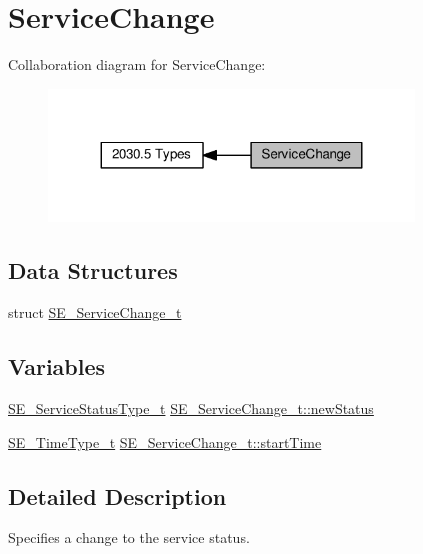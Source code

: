 \hypertarget{group__ServiceChange}{}\section{Service\+Change}
\label{group__ServiceChange}
Collaboration diagram for Service\+Change\+:\nopagebreak
\begin{figure}[H]
\begin{center}
\leavevmode
\includegraphics[width=275pt]{group__ServiceChange}
\end{center}
\end{figure}
\subsection*{Data Structures}
\begin{DoxyCompactItemize}
\item 
struct \hyperlink{structSE__ServiceChange__t}{S\+E\+\_\+\+Service\+Change\+\_\+t}
\end{DoxyCompactItemize}
\subsection*{Variables}
\begin{DoxyCompactItemize}
\item 
\hyperlink{group__ServiceStatusType_gaa3cd725afc87388d65acf81254caee7d}{S\+E\+\_\+\+Service\+Status\+Type\+\_\+t} \hyperlink{group__ServiceChange_ga6fc30f7a71370dcc2caad34630b3404e}{S\+E\+\_\+\+Service\+Change\+\_\+t\+::new\+Status}
\item 
\hyperlink{group__TimeType_ga6fba87a5b57829b4ff3f0e7638156682}{S\+E\+\_\+\+Time\+Type\+\_\+t} \hyperlink{group__ServiceChange_gad007f73cce823a5322de7f46935a4bfe}{S\+E\+\_\+\+Service\+Change\+\_\+t\+::start\+Time}
\end{DoxyCompactItemize}


\subsection{Detailed Description}
Specifies a change to the service status. 

